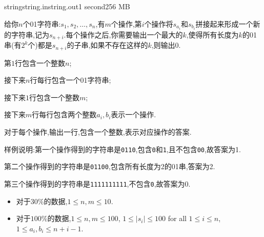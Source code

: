 \documentclass[11pt,a4paper,oneside]{article}
\begin{document}
\begin{problem}{string}{string.in}{string.out}{1 second}{256 MB}

    给你$n$个01字符串:$s_1,s_2,\dots,s_n$,有$m$个操作,第$i$个操作将$s_{a_i}$和$s_{b_i}$拼接起来形成一个新的字符串,记为$s_{n+i}$.每个操作之后,你需要输出一个最大的$k$,使得所有长度为$k$的01串(有$2^k$个)都是$s_{n+i}$的子串,如果不存在这样的$k$,则输出$0$.
    
    \InputFile

    第$1$行包含一个整数$n$;
    
    接下来$n$行每行包含一个01字符串;
    
    接下来$1$行包含一个整数$m$;
    
    接下来$m$行每行包含两个整数$a_i, b_i$表示一个操作.

    \OutputFile
    
    对于每个操作,输出一行,包含一个整数,表示对应操作的答案.

    \Example

    \begin{example}
    \end{example}

	样例说明:第一个操作得到的字符串是\verb|0110|,包含\verb|0|和\verb|1|,且不包含\verb|00|,故答案为1.
	
	第二个操作得到的字符串是\verb|01100|,包含所有长度为2的01串,答案为2.
	
	第三个操作得到的字符串是\verb|1111111111|,不包含\verb|0|,故答案为0.

    \Note
    \begin{itemize}
        \item 对于$30\%$的数据,$1 \leq n, m \leq 10$.
        \item 对于$100\%$的数据,$1 \leq n, m \leq 100$, $1 \leq \vert s_i \vert \leq 100$ for all $1 \leq i \leq n$, $1 \leq a_i, b_i \leq n+i-1$.
    \end{itemize}

\end{problem}
\end{document}
